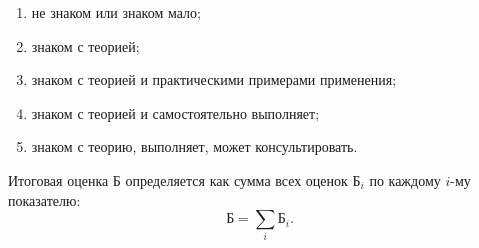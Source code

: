\begin{enumerate}[label=\arabic* --]
    \item не знаком или знаком мало;
    \item знаком с теорией;
    \item знаком с теорией и практическими примерами применения;
    \item знаком с теорией и самостоятельно выполняет;
    \item знаком с теорию, выполняет, может консультировать.
\end{enumerate}

Итоговая оценка Б определяется как сумма всех оценок $\text{Б}_i$ по каждому $i$-му показателю:
\begin{equation}
    \text{Б} = \sum_i \text{Б}_i.
\end{equation}

